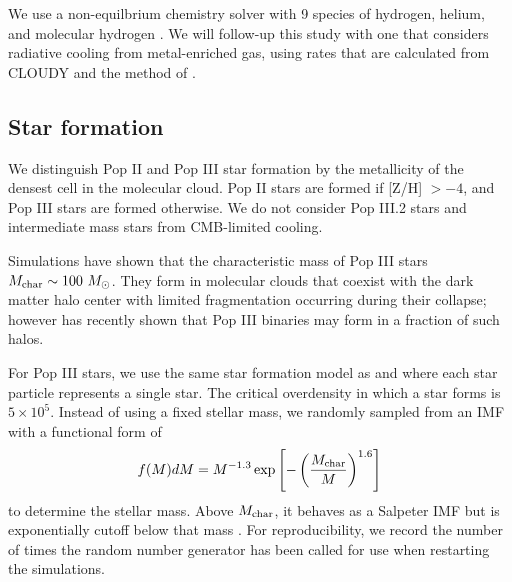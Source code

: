 \documentclass[apjl]{emulateapj}
\begin{document}
We use a non-equilbrium chemistry solver with 9 species of hydrogen,
helium, and molecular hydrogen \citep{Abel97}.  We will follow-up this
study with one that considers radiative cooling from metal-enriched
gas, using rates that are calculated from CLOUDY \citep{CLOUDY} and
the method of \citet{2008MNRAS.385.1443S}.


\subsection{Star formation}

We distinguish Pop II and Pop III star formation by the metallicity of
the densest cell in the molecular cloud.  Pop II stars are formed if
[Z/H] $> -4$, and Pop III stars are formed otherwise.  We do not
consider Pop III.2 stars and intermediate mass stars from CMB-limited
cooling.

Simulations have shown that the characteristic mass of Pop III stars
$M_{\rm char} \sim 100~\Ms$.  They form in molecular clouds that
coexist with the dark matter halo center with limited fragmentation
occurring during their collapse; however \citet{2009Sci...325..601T}
has recently shown that Pop III binaries may form in a fraction of
such halos.  


For Pop III stars, we use the same star formation model as
\citet{Abel07} and \citet{Wise08_Gal} where each star particle
represents a single star.  The critical overdensity in which a star
forms is $5 \times 10^5$.  Instead of using a fixed stellar mass, we
randomly sampled from an IMF with a functional form of
%
\begin{equation}
\label{eqn:imf}
f(M)dM = M^{-1.3} \exp\left[-\left(\frac{M_{\rm char}}{M}\right)^{1.6}\right]
\end{equation}
to determine the stellar mass.  Above $M_{\rm char}$, it behaves as a
Salpeter IMF but is exponentially cutoff below that mass
\citep{Chabrier03, Clark09}.  For reproducibility, we record the
number of times the random number generator \citep[Mersenne
  twister;][]{MTwister} has been called for use when restarting the
simulations.
\end{document}
